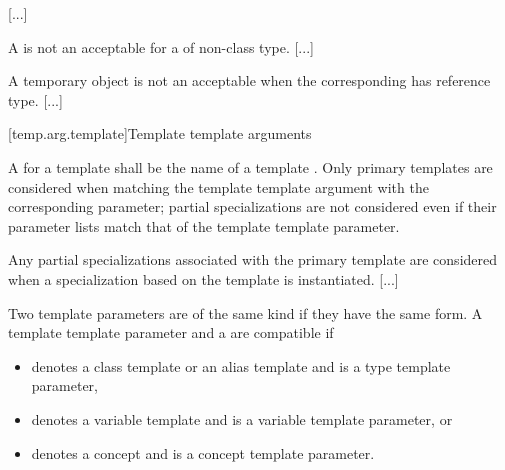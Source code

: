 \documentclass{wg21}
\begin{document}
\textcolor{noteclr}{[...]}

\pnum
\begin{note}
A  is
not an acceptable 
for a  of non-class type.
\textcolor{noteclr}{[...]}
\end{note}

\pnum
\begin{note}
A temporary object
is not an acceptable
when the corresponding
has reference type.
\textcolor{noteclr}{[...]}
\end{note}

[temp.arg.template]{Template template arguments}

\pnum A
for a template
shall be the name of a  template .
Only primary templates are considered when matching the template template
argument with the corresponding parameter; partial specializations are not
considered even if their parameter lists match that of the template template
parameter.

\pnum
Any partial specializations associated with the
primary template are considered when a
specialization based on the template 
is instantiated.
\textcolor{noteclr}{[...]}

\begin{addedblock}
Two template parameters are of the same kind if they have the same form.
A template template parameter  and a   are compatible if
\begin{itemize}
\item {} denotes a class template or an alias template and  is a type template parameter,
\item {} denotes a variable template and  is a variable template parameter, or
\item {} denotes a concept and  is a concept template parameter.
\end{itemize}
\end{addedblock}
\end{document}
